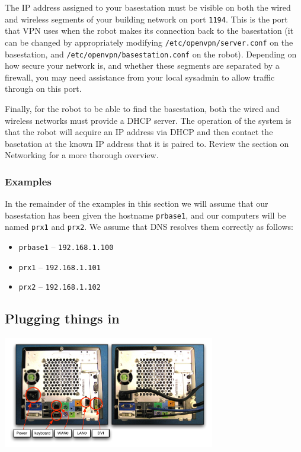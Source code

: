 The IP address assigned to your basestation must be visible on both
the wired and wireless segments of your building network on port
\texttt{1194}.  This is the port that VPN uses when the robot makes
its connection back to the basestation (it can be changed by
appropriately modifying \texttt{/etc/openvpn/server.conf} on the
basestation, and \texttt{/etc/openvpn/basestation.conf} on the robot).
Depending on how secure your network is, and whether these segments
are separated by a firewall, you may need assistance from your local
sysadmin to allow traffic through on this port.

Finally, for the robot to be able to find the basestation, both the
wired and wireless networks must provide a DHCP server.  The operation
of the system is that the robot will acquire an IP address via DHCP
and then contact the basetation at the known IP address that it is
paired to.  Review the section on Networking for a more thorough
overview.

\subsubsection{Examples}

In the remainder of the examples in this section we will assume that
our basestation has been given the hostname \texttt{prbase1}, and our
computers will be named \texttt{prx1} and \texttt{prx2}.  We assume
that DNS resolves them correctly as follows:

\begin{itemize}
\item \texttt{prbase1} -- \texttt{192.168.1.100}
\item \texttt{prx1} -- \texttt{192.168.1.101}
\item \texttt{prx2} -- \texttt{192.168.1.102}
\end{itemize}

\subsection{Plugging things in}
\includegraphics[width=350px]{images/pr2_basestation_plugs.pdf}

